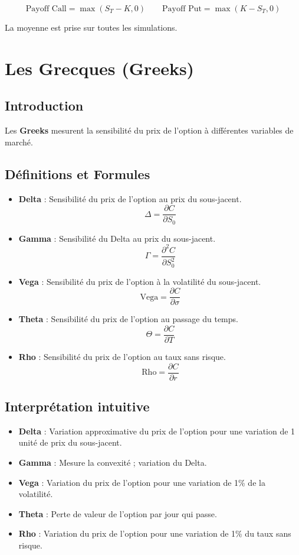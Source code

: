 \documentclass{article}
\begin{document}
\[
\text{Payoff Call} = \max(S_T - K, 0)
\quad\quad
\text{Payoff Put} = \max(K - S_T, 0)
\]

La moyenne est prise sur toutes les simulations.

\section{Les Grecques (Greeks)}

\subsection{Introduction}

Les \textbf{Greeks} mesurent la sensibilité du prix de l'option à différentes variables de marché.

\subsection{Définitions et Formules}

\begin{itemize}
    \item \textbf{Delta} : Sensibilité du prix de l'option au prix du sous-jacent.
    \[
    \Delta = \frac{\partial C}{\partial S_0}
    \]

    \item \textbf{Gamma} : Sensibilité du Delta au prix du sous-jacent.
    \[
    \Gamma = \frac{\partial^2 C}{\partial S_0^2}
    \]

    \item \textbf{Vega} : Sensibilité du prix de l'option à la volatilité du sous-jacent.
    \[
    \text{Vega} = \frac{\partial C}{\partial \sigma}
    \]

    \item \textbf{Theta} : Sensibilité du prix de l'option au passage du temps.
    \[
    \Theta = \frac{\partial C}{\partial T}
    \]

    \item \textbf{Rho} : Sensibilité du prix de l'option au taux sans risque.
    \[
    \text{Rho} = \frac{\partial C}{\partial r}
    \]
\end{itemize}

\subsection{Interprétation intuitive}

\begin{itemize}
    \item \textbf{Delta} : Variation approximative du prix de l'option pour une variation de 1 unité de prix du sous-jacent.
    \item \textbf{Gamma} : Mesure la convexité ; variation du Delta.
    \item \textbf{Vega} : Variation du prix de l'option pour une variation de 1\% de la volatilité.
    \item \textbf{Theta} : Perte de valeur de l'option par jour qui passe.
    \item \textbf{Rho} : Variation du prix de l'option pour une variation de 1\% du taux sans risque.
\end{itemize}
\end{document}
